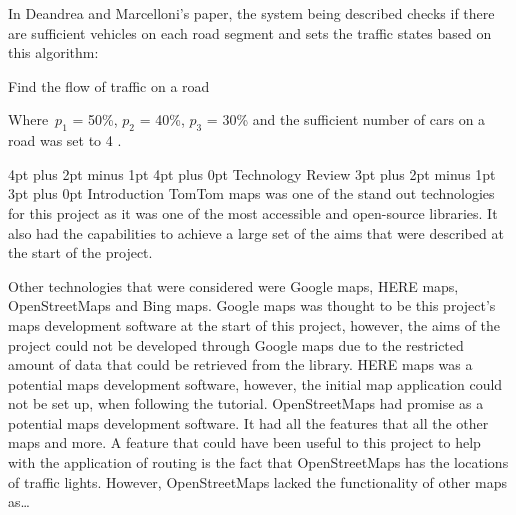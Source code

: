 \documentclass[12pt,a4paper]{article}
\makeatletter
\renewcommand\subsection{\@startsection {subsection}{1}{0mm} %
                               {3pt plus 2pt minus 1pt} %
                               {3pt plus 0pt} %
                               {\normalfont\bfseries}}
\renewcommand\section{\@startsection {section}{1}{0mm} %
                               {4pt plus 2pt minus 1pt} %
                               {4pt plus 0pt} %
                               {\Large\bfseries}}
\makeatother
\begin{document}
In Deandrea and Marcelloni’s paper, the system being described checks if there are sufficient vehicles on each road segment and sets the traffic states based on this algorithm:

\begin{algorithm}[H]
  \SetAlgoLined
   \caption{Find the flow of traffic on a road}
  \end{algorithm}

  Where~$p_1$ = 50\%, $p_2$ = 40\%, $p_3$ = 30\% and the sufficient number of cars on a road was set to 4 \cite{DAndrea2017}.
 

\section{Technology Review}
\subsection{Introduction}
TomTom maps was one of the stand out technologies for this project as it was one of the most accessible and open-source libraries. It also had the capabilities to achieve a large set of the aims that were described at the start of the project.  

Other technologies that were considered were Google maps, HERE maps, OpenStreetMaps and Bing maps. Google maps was thought to be this project’s maps development software at the start of this project, however, the aims of the project could not be developed through Google maps due to the restricted amount of data that could be retrieved from the library. HERE maps was a potential maps development software, however, the initial map application could not be set up, when following the tutorial. OpenStreetMaps had promise as a potential maps development software. It had all the features that all the other maps and more. A feature that could have been useful to this project to help with the application of routing is the fact that OpenStreetMaps has the locations of traffic lights. However, OpenStreetMaps lacked the functionality of other maps as…
\end{document}
